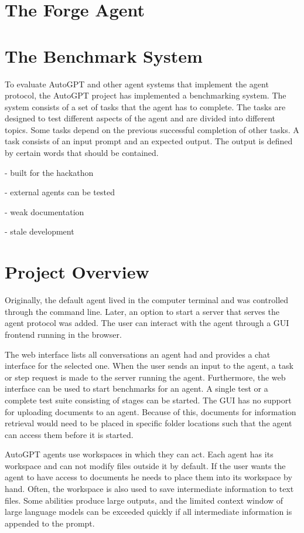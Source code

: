\documentclass[../main.tex]{subfiles}
\begin{document}
\section{The Forge Agent}
\label{sec:forge_agent}

\section{The Benchmark System}
\label{sec:benchmarking}

To evaluate AutoGPT and other agent systems that implement the agent protocol,
the AutoGPT project has implemented a benchmarking system.
The system consists of a set of tasks that the agent has to complete.
The tasks are designed to test different aspects of the agent and are divided into different topics.
Some tasks depend on the previous successful completion of other tasks.
A task consists of an input prompt and an expected output.
The output is defined by certain words that should be contained.

- built for the hackathon

- external agents can be tested

- weak documentation

- stale development

\section{Project Overview}

Originally,
the default agent lived in the computer terminal
and was controlled through the command line.
Later, an option to start a server that serves the agent protocol was added.
The user can interact with the agent through a GUI frontend running in the browser.

The web interface lists all conversations an agent had and provides a chat interface for the selected one.
When the user sends an input to the agent, a task or step request is made to the server running the agent.
Furthermore, the web interface can be used to start benchmarks for an agent.
A single test or a complete test suite consisting of stages can be started.
The GUI has no support for uploading documents to an agent.
Because of this, documents for information retrieval would need to be placed in specific folder locations
such that the agent can access them before it is started.

AutoGPT agents use workspaces in which they can act.
Each agent has its workspace and can not modify files outside it by default.
If the user wants the agent to have access to documents he needs to place them into its workspace by hand.
Often, the workspace is also used to save intermediate information to text files.
Some abilities produce large outputs,
and the limited context window of large language models can be exceeded quickly
if all intermediate information is appended to the prompt.
\end{document}
